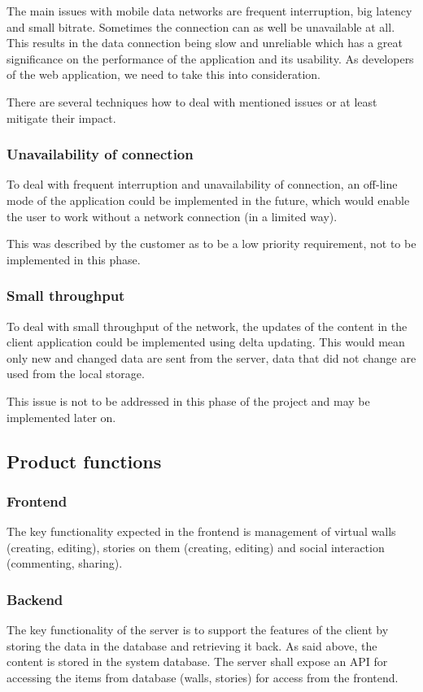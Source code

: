 \documentclass[11pt]{book}
\begin{document}
The main issues with mobile data networks are frequent interruption, big latency and small bitrate. Sometimes the connection can as well be unavailable at all. This results in the data connection being slow and unreliable which has a great significance on the performance of the application and its usability. As developers of the web application, we need to take this into consideration.

There are several techniques how to deal with mentioned issues or at least mitigate their impact.

\subsubsection{Unavailability of connection}\label{sec:req_unavailability_of_connection}
To deal with frequent interruption and unavailability of connection, an off-line mode of the application could be implemented in the future, which would enable the user to work without a network connection (in a limited way).

This was described by the customer as to be a low priority requirement, not to be implemented in this phase.

\subsubsection{Small throughput}
To deal with small throughput of the network, the updates of the content in the client application could be implemented using delta updating. This would mean only new and changed data are sent from the server, data that did not change are used from the local storage.

This issue is not to be addressed in this phase of the project and may be implemented later on.

\subsection{Product functions}

\subsubsection{Frontend}
The key functionality expected in the frontend is management of virtual walls (creating, editing), stories on them (creating, editing) and social interaction (commenting, sharing).

\subsubsection{Backend}
The key functionality of the server is to support the features of the client by storing the data in the database and retrieving it back. As said above, the content is stored in the system database. The server shall expose an API for accessing the items from database (walls, stories) for access from the frontend.
\end{document}
